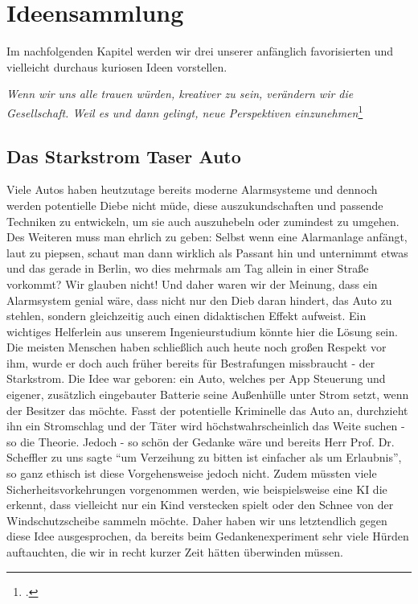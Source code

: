 \section{Ideensammlung}
Im nachfolgenden Kapitel werden wir drei unserer anfänglich favorisierten und vielleicht durchaus kuriosen Ideen vorstellen. 
\begin{center}
	\textit{Wenn wir uns alle trauen würden, kreativer zu sein, verändern wir die Gesellschaft. Weil es und dann gelingt, neue Perspektiven einzunehmen}\footcite{Bode2022}
\end{center}

\subsection{Das Starkstrom Taser Auto}
Viele Autos haben heutzutage bereits moderne Alarmsysteme und dennoch werden potentielle Diebe nicht müde, diese auszukundschaften und passende Techniken zu entwickeln, um sie auch auszuhebeln oder zumindest zu umgehen. Des Weiteren muss man ehrlich zu geben: Selbst wenn eine Alarmanlage anfängt, laut zu piepsen, schaut man dann wirklich als Passant hin und unternimmt etwas und das gerade in Berlin, wo dies mehrmals am Tag allein in einer Straße vorkommt? Wir glauben nicht! Und daher waren wir der Meinung, dass ein Alarmsystem genial wäre, dass nicht nur den Dieb daran hindert, das Auto zu stehlen, sondern gleichzeitig auch einen didaktischen Effekt aufweist. Ein wichtiges Helferlein aus unserem Ingenieurstudium könnte hier die Lösung sein. Die meisten Menschen haben schließlich auch heute noch großen Respekt vor ihm, wurde er doch auch früher bereits für Bestrafungen missbraucht - der Starkstrom. Die Idee war geboren: ein Auto, welches per App Steuerung und eigener, zusätzlich eingebauter Batterie seine Außenhülle unter Strom setzt, wenn der Besitzer das möchte. Fasst der potentielle Kriminelle das Auto an, durchzieht ihn ein Stromschlag und der Täter wird höchstwahrscheinlich das Weite suchen - so die Theorie. Jedoch - so schön der Gedanke wäre und bereits Herr Prof. Dr. Scheffler zu uns sagte “um Verzeihung zu bitten ist einfacher als um Erlaubnis”, so ganz ethisch ist diese Vorgehensweise jedoch nicht. Zudem müssten viele Sicherheitsvorkehrungen vorgenommen werden, wie beispielsweise eine KI die erkennt, dass vielleicht nur ein Kind verstecken spielt oder den Schnee von der Windschutzscheibe sammeln möchte. Daher haben wir uns letztendlich gegen diese Idee ausgesprochen, da bereits beim Gedankenexperiment sehr viele Hürden auftauchten, die wir in recht kurzer Zeit hätten überwinden müssen.


